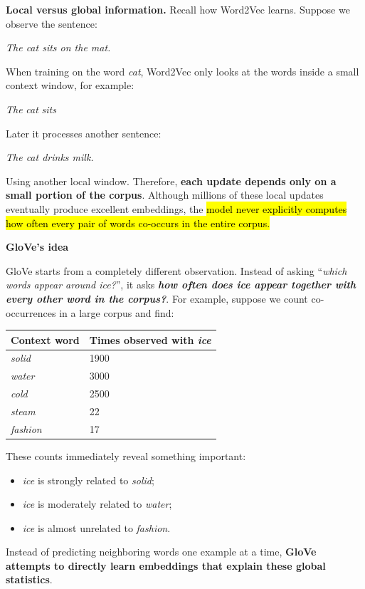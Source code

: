 \highspace
\textcolor{DarkOrange3}{ \textbf{Local versus global information.}} Recall how Word2Vec learns. Suppose we observe the sentence:
\begin{center}
    \emph{The cat sits on the mat.}
\end{center}
When training on the word \emph{cat}, Word2Vec only looks at the words inside a small context window, for example:
\begin{center}
    \emph{The} \quad \emph{cat} \quad \emph{sits}
\end{center}
Later it processes another sentence:
\begin{center}
    \emph{The cat drinks milk.}
\end{center}
Using another local window. Therefore, \textbf{each update depends only on a small portion of the corpus}. Although millions of these local updates eventually produce excellent embeddings, the \hl{model never explicitly computes how often every pair of words co-occurs in the entire corpus.}

\newpage

\begin{flushleft}
    \textcolor{Green3}{ \textbf{GloVe's idea}}
\end{flushleft}
GloVe starts from a completely different observation. Instead of asking ``\emph{which words appear around ice?}'', it asks \emph{\textbf{how often does ice appear together with every other word in the corpus?}}. For example, suppose we count co-occurrences in a large corpus and find:
\begin{center}
    \begin{tabular}{@{} l l @{}}
        \toprule
        \textbf{Context word} & \textbf{Times observed with \emph{ice}} \\
        \midrule
        \emph{solid} & 1900 \\
        \emph{water} & 3000 \\
        \emph{cold}  & 2500 \\
        \emph{steam} & 22 \\
        \emph{fashion} & 17 \\
        \bottomrule
    \end{tabular}
\end{center}
\noindent
These counts immediately reveal something important:
\begin{itemize}
    \item \emph{ice} is strongly related to \emph{solid};
    \item \emph{ice} is moderately related to \emph{water};
    \item \emph{ice} is almost unrelated to \emph{fashion}.
\end{itemize}
Instead of predicting neighboring words one example at a time, \textbf{GloVe attempts to directly learn embeddings that explain these global statistics}.


